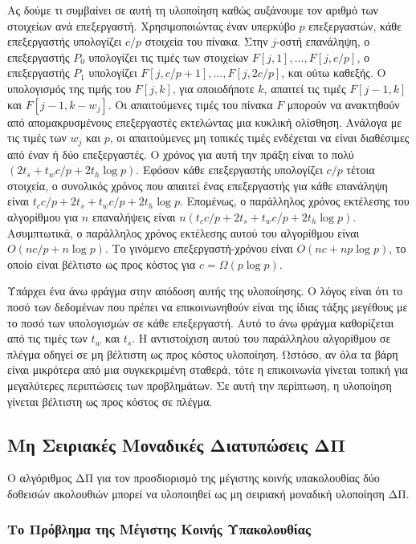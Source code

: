 \documentclass[12pt,a4paper]{article}
\begin{document}
Ας δούμε τι συμβαίνει σε αυτή τη υλοποίηση καθώς αυξάνουμε τον
αριθμό των στοιχείων ανά επεξεργαστή. Χρησιμοποιώντας έναν υπερκύβο
$p$ επεξεργαστών, κάθε επεξεργαστής υπολογίζει $c/p$ στοιχεία του
πίνακα. Στην $j$-οστή επανάληψη, ο επεξεργαστής $P_0$ υπολογίζει
τις τιμές των στοιχείων $F[j, 1], \ldots, F[j, c/p]$, ο επεξεργαστής
$P_1$ υπολογίζει $F[j, c/p+1], \ldots, F[j, 2c/p]$, και ούτω καθεξής.
Ο υπολογισμός της τιμής του $F[j, k]$, για οποιοδήποτε $k$, απαιτεί
τις τιμές $F[j-1, k]$ και $F[j-1, k-w_j]$. Οι απαιτούμενες τιμές
του πίνακα $F$ μπορούν να ανακτηθούν από απομακρυσμένους επεξεργαστές
εκτελώντας μια κυκλική ολίσθηση. Ανάλογα με τις τιμές των $w_j$ και
$p$, οι απαιτούμενες μη τοπικές τιμές ενδέχεται να είναι διαθέσιμες
από έναν ή δύο επεξεργαστές. Ο χρόνος για αυτή την πράξη είναι το
πολύ $(2t_s + t_w c/p + 2t_h \log p)$. Εφόσον κάθε
επεξεργαστής υπολογίζει $c/p$ τέτοια στοιχεία, ο συνολικός χρόνος
που απαιτεί ένας επεξεργαστής για κάθε επανάληψη είναι
$t_c c/p + 2t_s + t_w c/p + 2t_h \log p$. Επομένως, ο παράλληλος
χρόνος εκτέλεσης του αλγορίθμου για $n$ επαναλήψεις είναι
$n(t_c c/p + 2t_s + t_w c/p + 2t_h \log p)$. Ασυμπτωτικά, ο
παράλληλος χρόνος εκτέλεσης αυτού του αλγορίθμου είναι
$O(nc/p + n \log p)$. Το γινόμενο επεξεργαστή-χρόνου είναι
$O(nc + np \log p)$, το οποίο είναι βέλτιστο ως προς κόστος για
$c = \Omega(p \log p)$.

Υπάρχει ένα άνω φράγμα στην απόδοση αυτής της υλοποίησης. Ο λόγος
είναι ότι το ποσό των δεδομένων που πρέπει να επικοινωνηθούν είναι
της ίδιας τάξης μεγέθους με το ποσό των υπολογισμών σε κάθε
επεξεργαστή. Αυτό το άνω φράγμα καθορίζεται από τις τιμές των $t_w$
και $t_s$. Η αντιστοίχιση αυτού του παράλληλου
αλγορίθμου σε πλέγμα οδηγεί σε μη βέλτιστη ως προς κόστος υλοποίηση. 
Ωστόσο, αν όλα τα βάρη είναι μικρότερα από μια
συγκεκριμένη σταθερά, τότε η επικοινωνία γίνεται τοπική για
μεγαλύτερες περιπτώσεις των προβλημάτων. Σε αυτή την περίπτωση, η
υλοποίηση γίνεται βέλτιστη ως προς κόστος σε πλέγμα.

\subsection{Μη Σειριακές Μοναδικές Διατυπώσεις ΔΠ}

Ο αλγόριθμος ΔΠ για τον προσδιορισμό της μέγιστης κοινής
υπακολουθίας δύο δοθεισών ακολουθιών μπορεί να υλοποιηθεί ως μη
σειριακή μοναδική υλοποίηση ΔΠ.

\subsubsection{Το Πρόβλημα της Μέγιστης Κοινής Υπακολουθίας}
\end{document}
